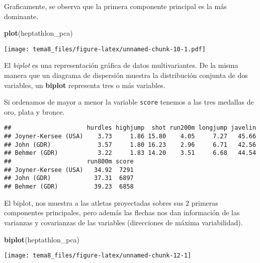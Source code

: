 \documentclass[]{article}
\newenvironment{Shaded}{\begin{snugshade}}{\end{snugshade}}
\newcommand{\KeywordTok}[1]{\textcolor[rgb]{0.13,0.29,0.53}{\textbf{{#1}}}}
\newcommand{\DataTypeTok}[1]{\textcolor[rgb]{0.13,0.29,0.53}{{#1}}}
\newcommand{\DecValTok}[1]{\textcolor[rgb]{0.00,0.00,0.81}{{#1}}}
\newcommand{\OtherTok}[1]{\textcolor[rgb]{0.56,0.35,0.01}{{#1}}}
\newcommand{\NormalTok}[1]{{#1}}
\numberwithin{equation}{section}
\begin{document}
Graficamente, se observa que la primera componente principal es la más
dominante.

\begin{Shaded}
\begin{Highlighting}[]
\KeywordTok{plot}\NormalTok{(heptathlon_pca)}
\end{Highlighting}
\end{Shaded}

\texttt{[image: tema8\_files/figure-latex/unnamed-chunk-10-1.pdf]}

El \emph{biplot} es una representación gráfica de datos multivariantes.
De la misma manera que un diagrama de dispersión muestra la distribución
conjunta de dos variables, un \textbf{biplot} representa tres o más
variables.

Si ordenamos de mayor a menor la variable \texttt{score} tenemos a las
tres medallas de oro, plata y bronce.

\begin{Shaded}
\end{Shaded}

\begin{verbatim}
##                     hurdles highjump  shot run200m longjump javelin
## Joyner-Kersee (USA)    3.73     1.86 15.80    4.05     7.27   45.66
## John (GDR)             3.57     1.80 16.23    2.96     6.71   42.56
## Behmer (GDR)           3.22     1.83 14.20    3.51     6.68   44.54
##                     run800m score
## Joyner-Kersee (USA)   34.92  7291
## John (GDR)            37.31  6897
## Behmer (GDR)          39.23  6858
\end{verbatim}

El biplot, nos muestra a las atletas proyectadas sobres sus 2 primeras
componentes principales, pero además las flechas nos dan información de
las varianzas y covarianzas de las variables (direcciones de máxima
variabilidad).

\begin{Shaded}
\begin{Highlighting}[]
\KeywordTok{biplot}\NormalTok{(heptathlon_pca)}
\end{Highlighting}
\end{Shaded}

\begin{center}\texttt{[image: tema8\_files/figure-latex/unnamed-chunk-12-1]} \end{center}
\end{document}
